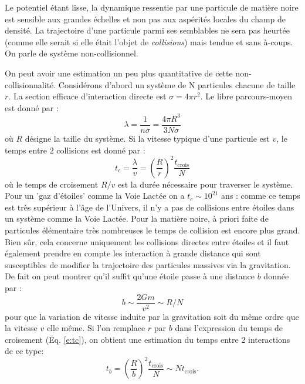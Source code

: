 Le potentiel étant lisse, la dynamique ressentie par une particule de matière noire est sensible aux grandes échelles et non pas aux aspérités locales du champ de densité. La trajectoire d'une particule parmi ses semblables ne sera pas heurtée (comme elle serait si elle était l'objet de \textit{collisions}) mais tendue et sans à-coups. On parle de système non-collisionnel.

On peut avoir une estimation un peu plus quantitative de cette non-collisionnalité. Considérons d'abord un système de N particules chacune de taille $r$. La section efficace d'interaction directe est $\sigma=4\pi r^2$. Le libre parcours-moyen est donné par :
\begin{equation}
\lambda=\frac{1}{n\sigma}=\frac{4\pi R^3}{3 N \sigma}
\end{equation}
où $R$ désigne la taille du système. Si la vitesse typique d'une particule est $v$, le temps entre 2 collisions est donné par :
\begin{equation}
t_c=\frac{\lambda}{v}=\left(\frac{R}{r}\right)^2 \frac{t_\mathrm{crois}}{N}
\label{e:tc}
\end{equation}
où le temps de croisement $R/v$ est la durée nécessaire pour traverser le système. Pour un 'gaz d'étoiles' comme la Voie Lactée on a $t_c\sim 10^{21}$ ans : comme ce temps est très supérieur à l'âge de l'Univers, il n'y a pas de collisions entre étoiles dans un système comme la Voie Lactée. Pour la matière noire, à priori faite de particules élémentaire très nombreuses le temps de collision est encore plus grand.
Bien sûr, cela concerne uniquement les collisions directes entre étoiles et il faut également prendre en compte les interaction à grande distance qui sont susceptibles de modifier la trajectoire des particules massives via la gravitation. De fait on peut montrer qu'il suffit qu'une étoile passe à une distance $b$ donnée par :
\begin{equation}
b\sim\frac{2Gm}{v^2}\sim R/N
\end{equation}
pour que la variation de vitesse induite par la gravitation soit du même ordre que la vitesse $v$ elle même. Si l'on remplace $r$ par $b$ dans l'expression du temps de croisement (Eq. \ref{e:tc}), on obtient une estimation du temps entre 2 interactions de ce type:
\begin{equation}
t_b=\left(\frac{R}{b}\right)^2 \frac{t_\mathrm{crois}}{N}\sim N t_\mathrm{crois}.
\end{equation}
